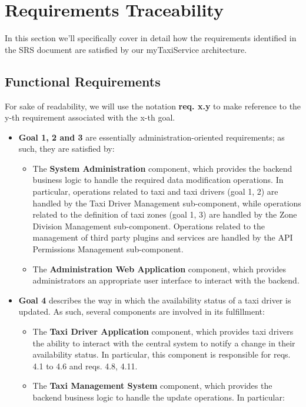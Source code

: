 \chapter{Requirements Traceability}
In this section we'll specifically cover in detail how the requirements identified in the SRS document are satisfied by our myTaxiService architecture. 

\section{Functional Requirements}

For sake of readability, we will use the notation \textbf{req. x.y} to make reference to the y-th requirement associated with the x-th goal.

\begin{itemize}
	\item \textbf{Goal 1, 2 and 3} are essentially administration-oriented requirements; as such, they are satisfied by:
	\begin{itemize}
	\item The \textbf{System Administration} component, which provides the backend business logic to handle the required data modification operations. In particular, operations related to taxi and taxi drivers (goal 1, 2) are handled by the Taxi Driver Management sub-component, while operations related to the definition of taxi zones (goal 1, 3) are handled by the Zone Division Management sub-component. Operations related to the management of third party plugins and services are handled by the API Permissions Management sub-component.
	\item The \textbf{Administration Web Application} component, which provides administrators an appropriate user interface to interact with the backend.
	\end{itemize}
	\item \textbf{Goal 4} describes the way in which the availability status of a taxi driver is updated. As such, several components are involved in its fulfillment:
	\begin{itemize}
	\item The \textbf{Taxi Driver Application} component, which provides taxi drivers the ability to interact with the central system to notify a change in their availability status. In particular, this component is responsible for reqs. 4.1 to 4.6 and reqs. 4.8, 4.11.
	\item The \textbf{Taxi Management System} component, which provides the backend business logic to handle the update operations. In particular:

\end{itemize}
\end{itemize}
